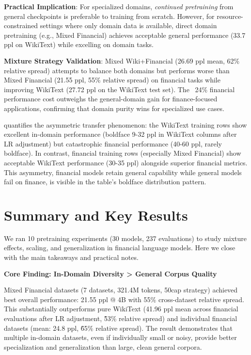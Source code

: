 \textbf{Practical Implication}: For specialized domains, \textit{continued pretraining} from general checkpoints is preferable to training from scratch. However, for resource-constrained settings where only domain data is available, direct domain pretraining (e.g., Mixed Financial) achieves acceptable general performance (33.7 ppl on WikiText) while excelling on domain tasks.

\textbf{Mixture Strategy Validation}: Mixed Wiki+Financial (26.69 ppl mean, 62\% relative spread) attempts to balance both domains but performs worse than Mixed Financial (21.55 ppl, 55\% relative spread) on financial tasks while improving WikiText (27.72 ppl on the WikiText test set). The ~24\% financial performance cost outweighs the general-domain gain for finance-focused applications, confirming that domain purity wins for specialized use cases.



 quantifies the asymmetric transfer phenomenon: the WikiText training rows show excellent in-domain performance (boldface 9-32 ppl in WikiText columns after LR adjustment) but catastrophic financial performance (40-60 ppl, rarely boldface). In contrast, financial training rows (especially Mixed Financial) show acceptable WikiText performance (30-35 ppl) alongside superior financial metrics. This asymmetry, financial models retain general capability while general models fail on finance, is visible in the table's boldface distribution pattern.

\section{Summary and Key Results}

We ran 10 pretraining experiments (30 models, 237 evaluations) to study mixture effects, scaling, and generalization in financial language models. Here we close with the main takeaways and practical notes.

\textbf{Core Finding: In-Domain Diversity > General Corpus Quality}

Mixed Financial datasets (7 datasets, 321.4M tokens, 50cap strategy) achieved best overall performance: 21.55 ppl @ 4B with 55\% cross-dataset relative spread. This substantially outperforms pure WikiText (41.96 ppl mean across financial evaluations after LR adjustment, \~53\% relative spread) and individual financial datasets (mean: 24.8 ppl, \~65\% relative spread). The result demonstrates that multiple in-domain datasets, even if individually small or noisy, provide better specialization and generalization than large, clean general corpora.

